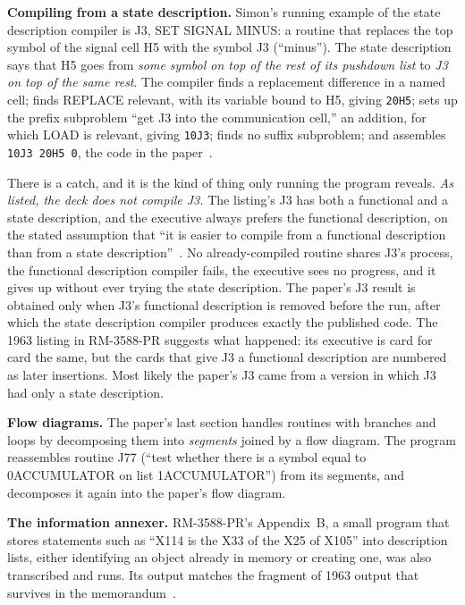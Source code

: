 \documentclass[11pt]{article}
\begin{document}
\textbf{Compiling from a state description.} Simon's running example of
the state description compiler is J3, SET SIGNAL MINUS: a routine that
replaces the top symbol of the signal cell H5 with the symbol J3
(``minus''). The state description says that H5 goes from \emph{some
symbol on top of the rest of its pushdown list} to \emph{J3 on top of
the same rest}. The compiler finds a replacement difference in a named
cell; finds REPLACE relevant, with its variable bound to H5, giving
\texttt{20H5}; sets up the prefix subproblem ``get J3 into the
communication cell,'' an addition, for which LOAD is relevant, giving
\texttt{10J3}; finds no suffix subproblem; and assembles
\texttt{10J3 20H5 0}, the code in the paper~\cite[p.~498]{simon1963jacm}.

There is a catch, and it is the kind of thing only running the program
reveals. \emph{As listed, the deck does not compile J3.} The listing's
J3 has both a functional and a state description, and the executive
always prefers the functional description, on the stated assumption
that ``it is easier to compile from a functional description than from
a state description''~\cite[p.~502]{simon1963jacm}. No already-compiled routine shares J3's process,
the functional description compiler fails, the executive sees no
progress, and it gives up without ever trying the state description.
The paper's J3 result is obtained only when J3's functional description
is removed before the run, after which the state description compiler
produces exactly the published code. The 1963 listing in RM-3588-PR
suggests what happened: its executive is card for card the same, but
the cards that give J3 a functional description are numbered as later
insertions. Most likely the paper's J3 came from a version in which J3
had only a state description.

\textbf{Flow diagrams.} The paper's last section handles routines with
branches and loops by decomposing them into \emph{segments} joined by a
flow diagram. The program reassembles routine J77 (``test whether there
is a symbol equal to 0ACCUMULATOR on list 1ACCUMULATOR'') from its
segments, and decomposes it again into the paper's flow diagram.

\textbf{The information annexer.} RM-3588-PR's Appendix~B, a small
program that stores statements such as ``X114 is the X33 of the X25 of
X105'' into description lists, either identifying an object already in
memory or creating one, was also transcribed and runs. Its
output matches the fragment of 1963 output that survives in the
memorandum~\cite{simonRM3588,earepo}.
\end{document}
